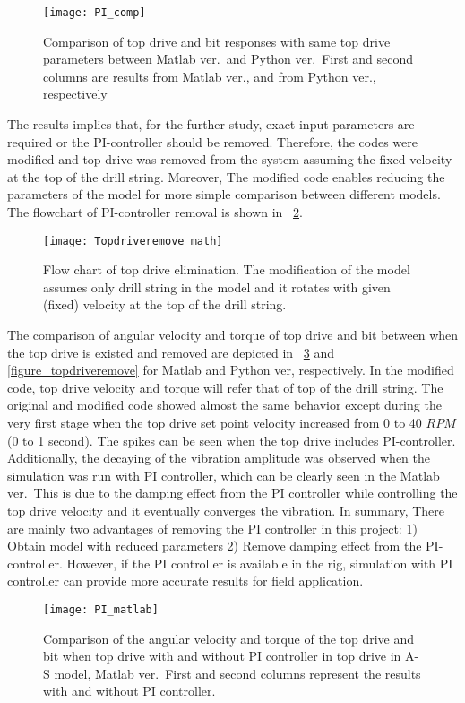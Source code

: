 \begin{figure}
  \centering
  \texttt{[image: PI\_comp]}
  \caption[Comparison of drill string response to same top drive parameters]{Comparison of top drive and bit responses with same top drive parameters between Matlab ver.\ and Python ver.\ First and second columns are results from Matlab ver., and from Python ver., respectively}\label{figure_topdrive_sensitivity}
\end{figure}

The results implies that, for the further study, exact input parameters are required or the PI-controller should be removed. Therefore, the codes were modified and top drive was removed from the system assuming the fixed velocity at the top of the drill string. Moreover, The modified code enables reducing the parameters of the model for more simple comparison between different models. The flowchart of PI-controller removal is shown in \figurename~\ref{figure_Topdriveremove_math}. 

\begin{figure}
  \centering
  \texttt{[image: Topdriveremove\_math]}
  \caption[Flow chart of top drive elimination]{Flow chart of top drive elimination. The modification of the model assumes only drill string in the model and it rotates with given (fixed) velocity at the top of the drill string.}\label{figure_Topdriveremove_math}
\end{figure}

The comparison of angular velocity and torque of top drive and bit between when the top drive is existed and removed are depicted in \figurename~\ref{figure_topdriveremove_Matlab} and \ref{figure_topdriveremove} for Matlab and Python ver, respectively. In the modified code, top drive velocity and torque will refer that of top of the drill string. The original and modified code showed almost the same behavior except during the very first stage when the top drive set point velocity increased from 0 to 40 $RPM$ (0 to 1 second). The spikes can be seen when the top drive includes PI-controller. Additionally, the decaying of the vibration amplitude was observed when the simulation was run with PI controller, which can be clearly seen in the Matlab ver.\ This is due to the damping effect from the PI controller while controlling the top drive velocity and it eventually converges the vibration. In summary, There are mainly two advantages of removing the PI controller in this project: 1) Obtain model with reduced parameters 2) Remove damping effect from the PI-controller. However, if the PI controller is available in the rig, simulation with PI controller can provide more accurate results for field application.
\begin{figure}
  \centering
  \texttt{[image: PI\_matlab]}
  \caption[comparison between with and without top drive: Matlab ver]{Comparison of the angular velocity and torque of the top drive and bit when top drive with and without PI controller in top drive in A-S model, Matlab ver.\ First and second columns represent the results with and without PI controller.}\label{figure_topdriveremove_Matlab}
\end{figure}

